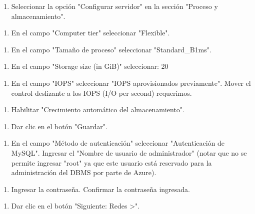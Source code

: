 \begin{enumerate}
\item Seleccionar la opción "Configurar servidor" en la sección "Proceso y almacenamiento".
\end{enumerate}

\begin{enumerate}
\item En el campo "Computer tier" seleccionar "Flexible".
\end{enumerate}

\begin{enumerate}
\item En el campo "Tamaño de proceso" seleccionar "Standard\_B1ms".
\end{enumerate}

\begin{enumerate}
\item En el campo "Storage size (in GiB)" seleccionar: 20
\end{enumerate}

\begin{enumerate}
\item En el campo "IOPS" seleccionar "IOPS aprovisionados previamente". Mover el control deslizante a los IOPS (I/O per second) requerimos.
\end{enumerate}

\begin{enumerate}
\item Habilitar "Crecimiento automático del almacenamiento".
\end{enumerate}

\begin{enumerate}
\item Dar clic en el botón "Guardar".
\end{enumerate}

\begin{enumerate}
\item En el campo "Método de autenticación" seleccionar "Autenticación de MySQL". Ingresar el "Nombre de usuario de administrador" (notar que no se permite ingresar "root" ya que este usuario está reservado para la administración del DBMS por parte de Azure).
\end{enumerate}

\begin{enumerate}
\item Ingresar la contraseña. Confirmar la contraseña ingresada.
\end{enumerate}

\begin{enumerate}
\item Dar clic en el botón "Siguiente: Redes >".
\end{enumerate}

